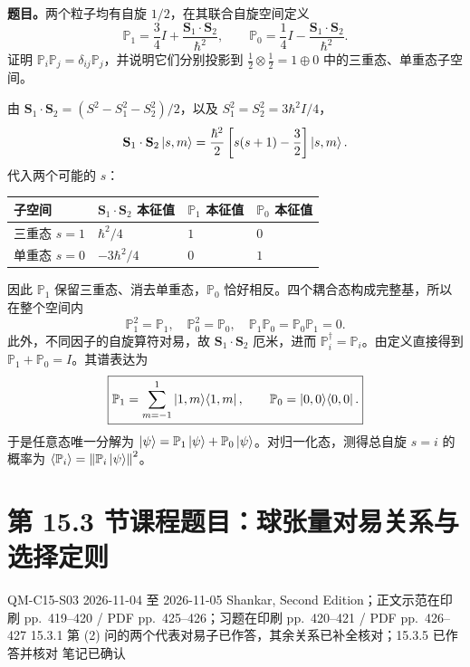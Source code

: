 \textbf{题目。}两个粒子均有自旋 $1/2$，在其联合自旋空间定义
\begin{equation}
  \mathbb P_1=\frac34I+\frac{\mathbf S_1\cdot\mathbf S_2}{\hbar^2},\qquad
  \mathbb P_0=\frac14I-\frac{\mathbf S_1\cdot\mathbf S_2}{\hbar^2}.
\end{equation}
证明 $\mathbb P_i\mathbb P_j=\delta_{ij}\mathbb P_j$，并说明它们分别投影到 $\tfrac12\otimes\tfrac12=1\oplus0$ 中的三重态、单重态子空间。

\begin{checkedsolution}
由 $\mathbf S_1\cdot\mathbf S_2=(S^2-S_1^2-S_2^2)/2$，以及 $S_1^2=S_2^2=3\hbar^2I/4$，
\begin{equation}
  \mathbf S_1\cdot\mathbf S_2\left|s,m\right\rangle
    =\frac{\hbar^2}{2}\left[s(s+1)-\frac32\right]\left|s,m\right\rangle.
\end{equation}
代入两个可能的 $s$：
\begin{center}
\begin{tabular}{@{}llll@{}}
  \toprule
  子空间 & $\mathbf S_1\cdot\mathbf S_2$ 本征值 & $\mathbb P_1$ 本征值 & $\mathbb P_0$ 本征值 \\
  \midrule
  三重态 $s=1$ & $\hbar^2/4$ & $1$ & $0$ \\
  单重态 $s=0$ & $-3\hbar^2/4$ & $0$ & $1$ \\
  \bottomrule
\end{tabular}
\end{center}
因此 $\mathbb P_1$ 保留三重态、消去单重态，$\mathbb P_0$ 恰好相反。四个耦合态构成完整基，所以在整个空间内
\begin{equation}
  \boxed{\mathbb P_1^2=\mathbb P_1,\quad
    \mathbb P_0^2=\mathbb P_0,\quad
    \mathbb P_1\mathbb P_0=\mathbb P_0\mathbb P_1=0.}
\end{equation}
此外，不同因子的自旋算符对易，故 $\mathbf S_1\cdot\mathbf S_2$ 厄米，进而 $\mathbb P_i^\dagger=\mathbb P_i$。由定义直接得到 $\mathbb P_1+\mathbb P_0=I$。其谱表达为
\begin{equation}
  \boxed{\mathbb P_1=\sum_{m=-1}^1\left|1,m\right\rangle\!\left\langle 1,m\right|,\qquad
    \mathbb P_0=\left|0,0\right\rangle\!\left\langle 0,0\right|.}
\end{equation}
于是任意态唯一分解为 $\left|\psi\right\rangle=\mathbb P_1\left|\psi\right\rangle+\mathbb P_0\left|\psi\right\rangle$。对归一化态，测得总自旋 $s=i$ 的概率为 $\left\langle \mathbb P_i \right\rangle=\left\lVert \mathbb P_i\left|\psi\right\rangle \right\rVert^2$。
\end{checkedsolution}

\section{第 15.3 节课程题目：球张量对易关系与选择定则}
\label{exercises:QM-C15-S03}
\exercisemeta
  {QM-C15-S03}
  {2026-11-04 至 2026-11-05}
  {Shankar, Second Edition；正文示范在印刷 pp.~419--420 / PDF pp.~425--426；习题在印刷 pp.~420--421 / PDF pp.~426--427}
  {15.3.1 第 (2) 问的两个代表对易子已作答，其余关系已补全核对；15.3.5 已作答并核对}
  {笔记已确认}

